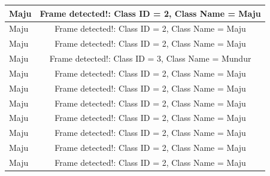 \begin{longtable}{|l|c|}
  Maju           & Frame detected!: Class ID = 2, Class Name = Maju   \\ \hline
  Maju           & Frame detected!: Class ID = 2, Class Name = Maju   \\ \hline
  Maju           & Frame detected!: Class ID = 2, Class Name = Maju   \\ \hline
  Maju           & Frame detected!: Class ID = 3, Class Name = Mundur \\ \hline
  Maju           & Frame detected!: Class ID = 2, Class Name = Maju   \\ \hline
  Maju           & Frame detected!: Class ID = 2, Class Name = Maju   \\ \hline
  Maju           & Frame detected!: Class ID = 2, Class Name = Maju   \\ \hline
  Maju           & Frame detected!: Class ID = 2, Class Name = Maju   \\ \hline
  Maju           & Frame detected!: Class ID = 2, Class Name = Maju   \\ \hline
  Maju           & Frame detected!: Class ID = 2, Class Name = Maju   \\ \hline
  Maju           & Frame detected!: Class ID = 2, Class Name = Maju   \\ \hline
\end{longtable}

